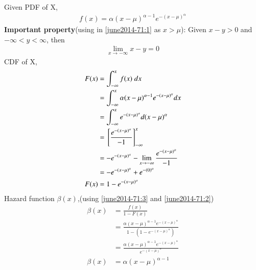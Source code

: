 Given PDF of X,
\begin{align}
    f(x)=\alpha(x-\mu)^{\alpha-1}e^{-(x-\mu)^{\alpha}}\label{june2014-71:3}
\end{align}
\textbf{Important property}(using in \eqref{june2014-71:1} as $x>\mu$):
Given $x-y>0$ and $-\infty<y<\infty$, then
\begin{align}
    \lim_{x \to -\infty} x-y=0
\end{align}
CDF of X,
\begin{align}
    F(x)&=\int_{-\infty}^x{f(x)\;dx}\\
    &=\int_{-\infty}^x{\alpha(x-\mu)^{\alpha-1}e^{-(x-\mu)^{\alpha}}dx}\\
    &=\int_{-\infty}^x{e^{-(x-\mu)^{\alpha}}d(x-\mu)^{\alpha}}\\
    &={}\left[\frac{e^{-(x-\mu)^{\alpha}}}{-1}\right]_{-\infty}^x\\
    &=-e^{-(x-\mu)^{\alpha}}-\lim_{x \to -\infty} \frac{e^{-(x-\mu)^{\alpha}}}{-1}\label{june2014-71:1}\\
    &=-e^{-(x-\mu)^{\alpha}}+ {e^{-(0)^{\alpha}}}\\
   F(x) &=1-e^{-(x-\mu)^{\alpha}}\label{june2014-71:2}
\end{align}
Hazard function $\beta(x)$,(using \eqref{june2014-71:3} and \eqref{june2014-71:2})
\begin{align}
    \beta(x)&=\frac{f(x)}{1-F(x)}\\
    &=\frac{\alpha(x-\mu)^{\alpha-1}e^{-(x-\mu)^{\alpha}}}{1-(1-e^{-(x-\mu)^{\alpha}})}\\
    &=\frac{\alpha(x-\mu)^{\alpha-1}e^{-(x-\mu)^{\alpha}}}{e^{-(x-\mu)^{\alpha}}}\\
    \beta(x)&=\alpha(x-\mu)^{\alpha-1}
\end{align}
